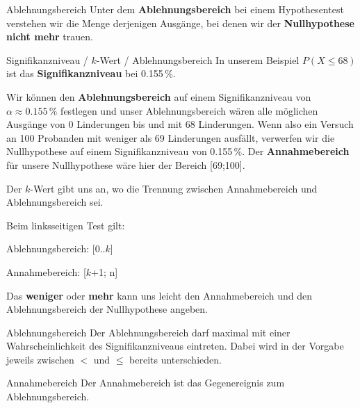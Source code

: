 \begin{definition}{Ablehnungsbereich}{}
  Unter dem \textbf{Ablehnungsbereich} bei einem Hypothesentest verstehen
  wir die Menge derjenigen Ausgänge, bei denen wir der
  \textbf{Nullhypothese} \textbf{nicht mehr} trauen.
\end{definition}

\begin{beispiel}{Signifikanzniveau / $k$-Wert / Ablehnungsbereich}{}
In unserem Beispiel $P(X \le 68)$ ist das \textbf{Signifikanzniveau} bei
0.155\,\%.

Wir können den \textbf{Ablehnungsbereich} auf einem
Signifikanzniveau von $\alpha \approx 0.155\,\%$ festlegen und unser Ablehnungsbereich
wären alle möglichen Ausgänge von 0 Linderungen bis und mit 68
Linderungen. Wenn also ein Versuch an 100 Probanden mit weniger als 69
Linderungen ausfällt, verwerfen wir die Nullhypothese auf einem
Signifikanzniveau von 0.155\,\%. Der \textbf{Annahmebereich} für
unsere Nullhypothese wäre hier der Bereich [69;100].

Der $k$-Wert gibt uns an, wo die Trennung zwischen Annahmebereich und
Ablehnungsbereich sei.

Beim linksseitigen Test gilt:

Ablehnungsbereich: [0..$k$]

Annahmebereich: [$k$+1; n]
\end{beispiel}



Das \textbf{weniger} oder \textbf{mehr} kann uns leicht den Annahmebereich und den Ablehnungsbereich der Nullhypothese angeben.

\begin{gesetz}{Ablehnungsbereich}{}
  Der Ablehnungsbereich darf maximal mit einer Wahrscheinlichkeit des Signifikanzniveaus eintreten. Dabei wird in der Vorgabe jeweils zwischen $<$ und $\le$ bereits unterschieden.
\end{gesetz}

\begin{gesetz}{Annahmebereich}{}
  Der Annahmebereich ist das Gegenereignis zum Ablehnungsbereich.
\end{gesetz}


